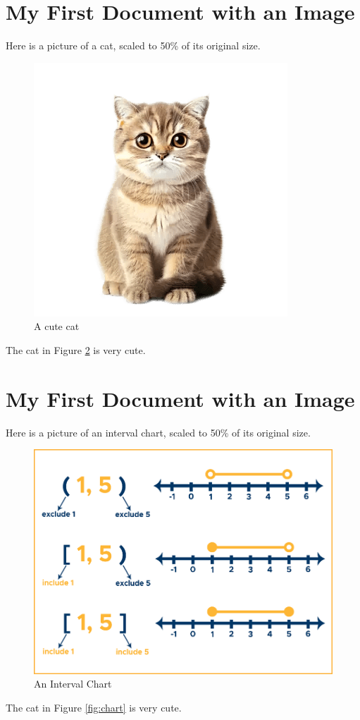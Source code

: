 \documentclass{article}
\begin{document}
\section{My First Document with an Image}

Here is a picture of a cat, scaled to 50\% of its original size.

\begin{figure}[h!]
    \centering
    \includegraphics[scale=0.5]{cat_picture2.png} %
    \caption{A cute cat}
    \label{fig:cat}
\end{figure}

The cat in Figure \ref{fig:cat} is very cute.

\section{My First Document with an Image}

Here is a picture of an interval chart, scaled to 50\% of its original size.

\begin{figure}[h!]
    \centering
    \includegraphics[scale=0.5]{Interval_chart.png} %
    \caption{An Interval Chart}
    \label{fig:cat}
\end{figure}

The cat in Figure \ref{fig:chart} is very cute.
\end{document}
